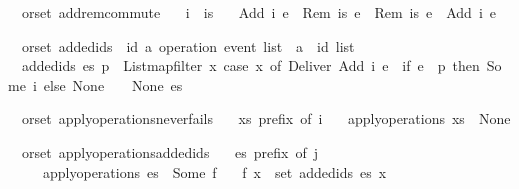 \begin{isabellebody}
\isamarkupfalse%
\ {\isacharparenleft}\ orset{\isacharparenright}\ add{\isacharunderscore}rem{\isacharunderscore}commute{\isacharcolon}\isanewline
\ \ \ {\isachardoublequoteopen}i\ {\isasymnotin}\ is{\isachardoublequoteclose}\isanewline
\ \ \ {\isachardoublequoteopen}{\isasymlangle}Add\ i\ e{}{\isasymrangle}\ {\isasymrhd}\ {\isasymlangle}Rem\ is\ e{}{\isasymrangle}\ {\isacharequal}\ {\isasymlangle}Rem\ is\ e{}{\isasymrangle}\ {\isasymrhd}\ {\isasymlangle}Add\ i\ e{}{\isasymrangle}{\isachardoublequoteclose}\isanewline
\end{isabellebody}

\begin{isabellebody}
\isamarkupfalse%
\ {\isacharparenleft}\ orset{\isacharparenright}\ added{\isacharunderscore}ids\ {\isacharcolon}{\isacharcolon}\ {\isachardoublequoteopen}{\isacharparenleft}{\isacharprime}id{\isacharcomma}\ {\isacharprime}a{\isacharparenright}\ operation\ event\ list\ {\isasymRightarrow}\ {\isacharprime}a\ {\isasymRightarrow}\ {\isacharprime}id\ list{\isachardoublequoteclose}\ \isanewline
\ \ {\isachardoublequoteopen}added{\isacharunderscore}ids\ es\ p\ {\isasymequiv}\ List{\isachardot}map{\isacharunderscore}filter\ {\isacharparenleft}{\isasymlambda}x{\isachardot}\ case\ x\ of\ Deliver\ {\isacharparenleft}Add\ i\ e{\isacharparenright}\ {\isasymRightarrow}\ if\ e\ {\isacharequal}\ p\ then\ Some\ i\ else\ None\ {\isacharbar}\ {\isacharunderscore}\ {\isasymRightarrow}\ None{\isacharparenright}\ es{\isachardoublequoteclose}\isanewline
\end{isabellebody}

\begin{isabellebody}
\isamarkupfalse%
\ {\isacharparenleft}\ orset{\isacharparenright}\ apply{\isacharunderscore}operations{\isacharunderscore}never{\isacharunderscore}fails{\isacharcolon}\isanewline
\ \ \ {\isachardoublequoteopen}xs\ prefix\ of\ i{\isachardoublequoteclose}\isanewline
\ \ \ {\isachardoublequoteopen}apply{\isacharunderscore}operations\ xs\ {\isasymnoteq}\ None{\isachardoublequoteclose}\isanewline
\end{isabellebody}

\begin{isabellebody}
\isamarkupfalse%
\ {\isacharparenleft}\ orset{\isacharparenright}\ apply{\isacharunderscore}operations{\isacharunderscore}added{\isacharunderscore}ids{\isacharcolon}\isanewline
\ \ \ {\isachardoublequoteopen}es\ prefix\ of\ j{\isachardoublequoteclose}\isanewline
\ \ \ \ \ {\isachardoublequoteopen}apply{\isacharunderscore}operations\ es\ {\isacharequal}\ Some\ f{\isachardoublequoteclose}\isanewline
\ \ \ {\isachardoublequoteopen}f\ x\ {\isasymsubseteq}\ set\ {\isacharparenleft}added{\isacharunderscore}ids\ es\ x{\isacharparenright}{\isachardoublequoteclose}\isanewline
\end{isabellebody}

